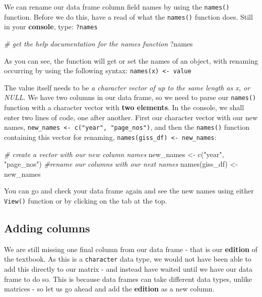 \documentclass[
]{book}
\newenvironment{Shaded}{\begin{snugshade}}{\end{snugshade}}
\newcommand{\CommentTok}[1]{\textcolor[rgb]{0.56,0.35,0.01}{\textit{#1}}}
\newcommand{\FunctionTok}[1]{\textcolor[rgb]{0.00,0.00,0.00}{#1}}
\newcommand{\NormalTok}[1]{#1}
\newcommand{\OtherTok}[1]{\textcolor[rgb]{0.56,0.35,0.01}{#1}}
\newcommand{\StringTok}[1]{\textcolor[rgb]{0.31,0.60,0.02}{#1}}
\begin{document}
We can rename our data frame column field names by using the \texttt{names()} function. Before we do this, have a read of what the \texttt{names()} function does. Still in your \textbf{console}, type: \texttt{?names}

\begin{Shaded}
\begin{Highlighting}[]
\CommentTok{\# get the help documentation for the names function}
\NormalTok{?names}
\end{Highlighting}
\end{Shaded}

As you can see, the function will get or set the names of an object, with renaming occurring by using the following syntax: \texttt{names(x)\ \textless{}-\ value}

The value itself needs to be \emph{a character vector of up to the same length as x, or NULL.} We have two columns in our data frame, so we need to parse our \texttt{names()} function with a character vector with \textbf{two elements}. In the console, we shall enter two lines of code, one after another. First our character vector with our new names, \texttt{new\_names\ \textless{}-\ c("year",\ "page\_nos")}, and then the \texttt{names()} function containing this vector for renaming, \texttt{names(giss\_df)\ \textless{}-\ new\_names}:

\begin{Shaded}
\begin{Highlighting}[]
\CommentTok{\# create a vector with our new column names}
\NormalTok{new\_names }\OtherTok{\textless{}{-}} \FunctionTok{c}\NormalTok{(}\StringTok{"year"}\NormalTok{, }\StringTok{"page\_nos"}\NormalTok{)}
\CommentTok{\#rename our columns with our next names}
\FunctionTok{names}\NormalTok{(giss\_df) }\OtherTok{\textless{}{-}}\NormalTok{ new\_names}
\end{Highlighting}
\end{Shaded}

You can go and check your data frame again and see the new names using either \texttt{View()} function or by clicking on the tab at the top.

\hypertarget{adding-columns}{%
\subsection{Adding columns}\label{adding-columns}}

We are still missing one final column from our data frame - that is our \textbf{edition} of the textbook. As this is a \texttt{character} data type, we would not have been able to add this directly to our matrix - and instead have waited until we have our data frame to do so. This is because data frames can take different data types, unlike matrices - so let us go ahead and add the \textbf{edition} as a new column.
\end{document}
